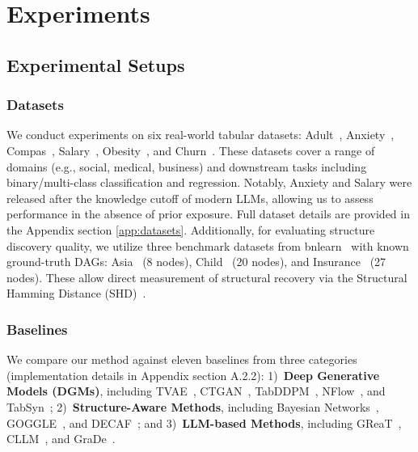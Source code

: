 \section{Experiments}
\subsection{Experimental Setups}
\subsubsection{Datasets}
We conduct experiments on six real-world tabular datasets: Adult~\cite{adult_2}, Anxiety~\cite{kaggleSocialAnxiety}, Compas~\cite{propublicaMachineBias}, Salary~\cite{kaggleGlobalMarket}, Obesity~\cite{obesity}, and Churn~\cite{churn}. These datasets cover a range of domains (e.g., social, medical, business) and downstream tasks including binary/multi-class classification and regression. Notably, Anxiety and Salary were released after the knowledge cutoff of modern LLMs, allowing us to assess performance in the absence of prior exposure. Full dataset details are provided in the Appendix section \ref{app:datasets}. Additionally, for evaluating structure discovery quality, we utilize three benchmark datasets from  bnlearn~\cite{scutari2010learning} with known ground-truth DAGs: Asia~\cite{bnlearn-repo-asia} (8 nodes), Child~\cite{bnlearn-repo-child} (20 nodes), and Insurance~\cite{bnlearn-repo-insurance} (27 nodes). These allow direct measurement of structural recovery via the Structural Hamming Distance (SHD)~\cite{de2009comparison}. 


\subsubsection{Baselines}
We compare our method against eleven baselines from three categories (implementation details in Appendix section A.2.2): 1)~\textbf{Deep Generative Models (DGMs)}, including TVAE~\cite{xu2019modeling}, CTGAN~\cite{xu2019modeling}, TabDDPM~\cite{kotelnikov2023tabddpm}, NFlow~\cite{papamakarios2021normalizing}, and TabSyn~\cite{tabsyn}; 2)~\textbf{Structure-Aware Methods}, including Bayesian Networks~\cite{ankan2015pgmpy}, GOGGLE~\cite{liu2023goggle}, and DECAF~\cite{van2021decaf}; and 3)~\textbf{LLM-based Methods}, including GReaT~\cite{borisov2023language}, CLLM~\cite{cllm2024}, and GraDe~\cite{zhang-etal-2025-features}. 

